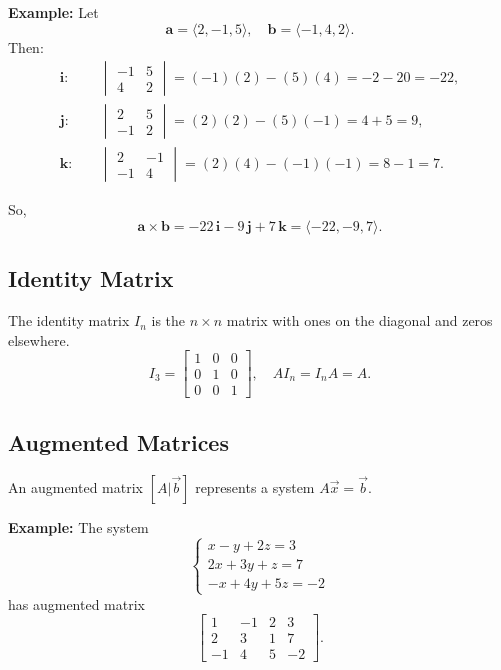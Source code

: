 \documentclass{article}
\begin{document}
\begin{multicols}{2}
\textbf{Example:} Let
\[
\mathbf{a} = \langle 2, -1, 5 \rangle, \quad
\mathbf{b} = \langle -1, 4, 2 \rangle.
\]
Then:
\begin{align*}
\mathbf{i}: & \quad
\begin{vmatrix}-1 & 5\\ 4 & 2\end{vmatrix} = (-1)(2) - (5)(4) = -2 - 20 = -22,\\
\mathbf{j}: & \quad
\begin{vmatrix}2 & 5\\ -1 & 2\end{vmatrix} = (2)(2) - (5)(-1) = 4 + 5 = 9,\\
\mathbf{k}: & \quad
\begin{vmatrix}2 & -1\\ -1 & 4\end{vmatrix} = (2)(4) - (-1)(-1) = 8 - 1 = 7.
\end{align*}

So,
\[
\mathbf{a} \times \mathbf{b} = -22\,\mathbf{i} - 9\,\mathbf{j} + 7\,\mathbf{k} = \langle -22, -9, 7 \rangle.
\]

\subsection*{Identity Matrix}
The identity matrix $I_n$ is the $n\times n$ matrix with ones on the diagonal and zeros elsewhere.
\[
I_3 = \begin{bmatrix}1 & 0 & 0\\0 & 1 & 0\\0 & 0 & 1\end{bmatrix},
\quad AI_n = I_nA = A.
\]

\subsection*{Augmented Matrices}
An augmented matrix $[A|\vec b]$ represents a system $A\vec x = \vec b$.

\textbf{Example:} The system
\[
\begin{cases}
x - y + 2z = 3 \\
2x + 3y + z = 7 \\
- x + 4y + 5z = -2
\end{cases}
\]
has augmented matrix
\[
\left[\begin{array}{ccc|c}
1 & -1 & 2 & 3 \\
2 & 3 & 1 & 7 \\
-1 & 4 & 5 & -2
\end{array}\right].
\]


\end{multicols}
\end{document}
